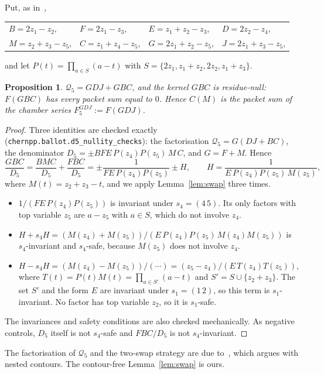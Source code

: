 \documentclass[11pt,a4paper]{article}
\theoremstyle{plain}
\newtheorem{proposition}[theorem]{Proposition}
\theoremstyle{definition}
\theoremstyle{remark}
\begin{document}
Put, as in~\cite[\S4.3]{FS},
\begin{center}\small
\begin{tabular}{@{}llll@{}}
$B = 2z_1 - z_2$, & $F = 2z_1 - z_3$, & $E = z_1 + z_2 - z_3$, & $D = 2z_2 - z_4$, \\
$M = z_2 + z_3 - z_5$, & $C = z_1 + z_4 - z_5$, & $G = 2z_1 + z_2 - z_5$, & $J = 2z_1 + z_3 - z_5$,
\end{tabular}
\end{center}
and let $P(t) = \prod_{a \in S}(a - t)$ with $S = \{2z_1, z_1 + z_2, 2z_2, z_1 + z_3\}$.

\begin{proposition}\label{prop:gbc}
$\mathcal Q_5 = GDJ + GBC$, and the kernel $GBC$ is residue-null: $F(GBC)$ has every packet sum
equal to $0$. Hence $C(M)$ is the packet sum of the chamber series $F_5^{GDJ} := F(GDJ)$.
\end{proposition}

\begin{proof}
Three identities are checked exactly (\texttt{chernpp.ballot.d5\_nullity\_checks}): the
factorisation $\mathcal Q_5 = G(DJ + BC)$, the denominator $D_5 = \pm BFE\,P(z_4)P(z_5)\,M\,C$, and
$G = F + M$. Hence
\[
  \frac{GBC}{D_5} = \frac{BMC}{D_5} + \frac{FBC}{D_5}
  = \pm\frac{1}{F E\,P(z_4) P(z_5)} \pm H, \qquad H = \frac{1}{E\,P(z_4)P(z_5)\,M(z_5)},
\]
where $M(t) = z_2 + z_3 - t$, and we apply Lemma~\ref{lem:swap} three times.
\begin{itemize}[nosep]
\item $1/(FE\,P(z_4)P(z_5))$ is invariant under $s_4 = (4\,5)$. Its only factors with top
  variable $z_5$ are $a - z_5$ with $a \in S$, which do not involve $z_4$.
\item $H + s_4H = (M(z_4) + M(z_5))/(E\,P(z_4)P(z_5)\,M(z_4)M(z_5))$ is $s_4$-invariant and
  $s_4$-safe, because $M(z_5)$ does not involve $z_4$.
\item $H - s_4H = (M(z_4) - M(z_5))/(\cdots) = (z_5 - z_4)/(E\,T(z_4)T(z_5))$, where
  $T(t) = P(t)M(t) = \prod_{a \in S'}(a - t)$ and $S' = S \cup \{z_2 + z_3\}$. The set $S'$ and the
  form $E$ are invariant under $s_1 = (1\,2)$, so this term is $s_1$-invariant. No factor has top
  variable $z_2$, so it is $s_1$-safe.
\end{itemize}
The invariances and safety conditions are also checked mechanically. As negative controls, $D_5$
itself is not $s_4$-safe and $FBC/D_5$ is not $s_4$-invariant.
\end{proof}

The factorisation of $\mathcal Q_5$ and the two-swap strategy are due to~\cite[\S\S4.3--4.4]{FS},
which argues with nested contours. The contour-free Lemma~\ref{lem:swap} is ours.
\end{document}

